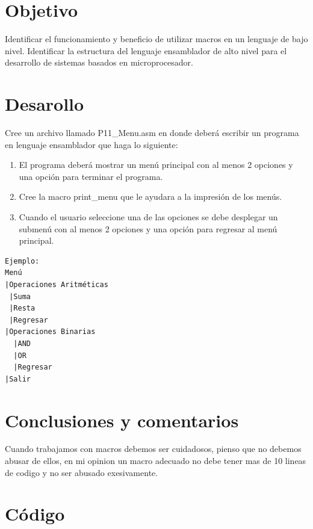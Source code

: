 \documentclass[12pt]{article}
\begin{document}
\section*{Objetivo}
\label{sec:orgaedb11d}
Identificar el funcionamiento y beneficio de utilizar macros en un lenguaje de bajo nivel. Identificar la estructura del  lenguaje ensamblador de alto nivel para el desarrollo de sistemas basados en microprocesador.

\section*{Desarollo}
\label{sec:org90fe00b}
Cree un archivo llamado P11\_Menu.asm en donde deberá escribir un programa en lenguaje ensamblador que haga lo siguiente:

\begin{enumerate}
\item El programa deberá mostrar un menú principal con al menos 2 opciones y una opción para terminar el programa.

\item Cree la macro print\_menu que le ayudara a la impresión de los menús.

\item Cuando el usuario seleccione una de las opciones se debe desplegar un submenú con al menos 2 opciones y una opción para regresar al menú principal.
\end{enumerate}

\begin{verbatim}
Ejemplo:
Menú
|Operaciones Aritméticas
 |Suma
 |Resta
 |Regresar
|Operaciones Binarias
  |AND
  |OR
  |Regresar
|Salir
\end{verbatim}

\section*{Conclusiones y comentarios}
\label{sec:org14773e2}
Cuando trabajamos con macros debemos ser cuidadosos, pienso que no debemos abusar de ellos, en mi opinion un macro adecuado no debe tener mas de 10 lineas de codigo y no ser abusado exesivamente.


\section*{Código}
\label{sec:orgdf46bad}
\\ 
\end{document}
